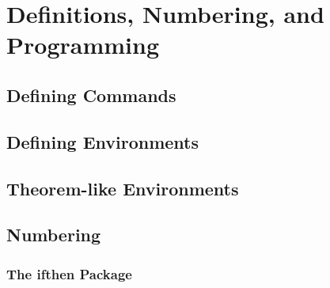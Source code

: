 \section{Definitions, Numbering, and Programming}
\subsection{Defining Commands}


\subsection{Defining Environments}


\subsection{Theorem-like Environments}


\subsection{Numbering}


\subsubsection{The ifthen Package}
\newpage